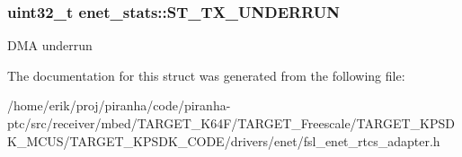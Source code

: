 \subsubsection[{\texorpdfstring{S\+T\+\_\+\+T\+X\+\_\+\+U\+N\+D\+E\+R\+R\+UN}{ST_TX_UNDERRUN}}]{\setlength{\rightskip}{0pt plus 5cm}uint32\+\_\+t enet\+\_\+stats\+::\+S\+T\+\_\+\+T\+X\+\_\+\+U\+N\+D\+E\+R\+R\+UN}\hypertarget{structenet__stats_a2d06ba5b567fe022065f6d897fb68248}{}\label{structenet__stats_a2d06ba5b567fe022065f6d897fb68248}
D\+MA underrun 

The documentation for this struct was generated from the following file\+:\begin{DoxyCompactItemize}
\item 
/home/erik/proj/piranha/code/piranha-\/ptc/src/receiver/mbed/\+T\+A\+R\+G\+E\+T\+\_\+\+K64\+F/\+T\+A\+R\+G\+E\+T\+\_\+\+Freescale/\+T\+A\+R\+G\+E\+T\+\_\+\+K\+P\+S\+D\+K\+\_\+\+M\+C\+U\+S/\+T\+A\+R\+G\+E\+T\+\_\+\+K\+P\+S\+D\+K\+\_\+\+C\+O\+D\+E/drivers/enet/fsl\+\_\+enet\+\_\+rtcs\+\_\+adapter.\+h\end{DoxyCompactItemize}
